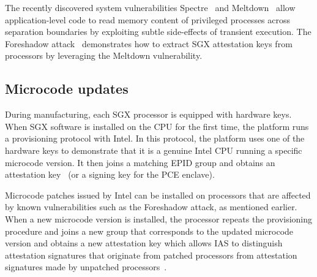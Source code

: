 The recently discovered system vulnerabilities Spectre~\cite{Kocher2018spectre} and Meltdown~\cite{Lipp2018meltdown} allow application-level code to read memory content of privileged processes across separation boundaries by exploiting subtle side-effects of transient execution. The Foreshadow attack~\cite{foreshadow-usenix18} demonstrates how to extract SGX attestation keys from processors by leveraging the Meltdown vulnerability. 

\subsection{Microcode updates}
During manufacturing, each SGX processor is equipped with hardware keys. When SGX software is installed on the CPU for the first time, the platform runs a provisioning protocol with Intel. In this protocol, the platform uses one of the hardware keys to demonstrate that it is a genuine Intel CPU running a specific microcode version. It then joins a matching EPID group and obtains an attestation key~\cite{epid_attestation} (or a signing key for the PCE enclave). 

Microcode patches issued by Intel can be installed on processors that are affected by known vulnerabilities such as the Foreshadow attack, as mentioned earlier. When a new microcode version is installed, the processor repeats the provisioning procedure and joins a new group that corresponds to the updated microcode version and obtains a new attestation key which allows IAS to distinguish attestation signatures that originate from patched processors from attestation signatures made by unpatched processors~\cite{epid_attestation}.
